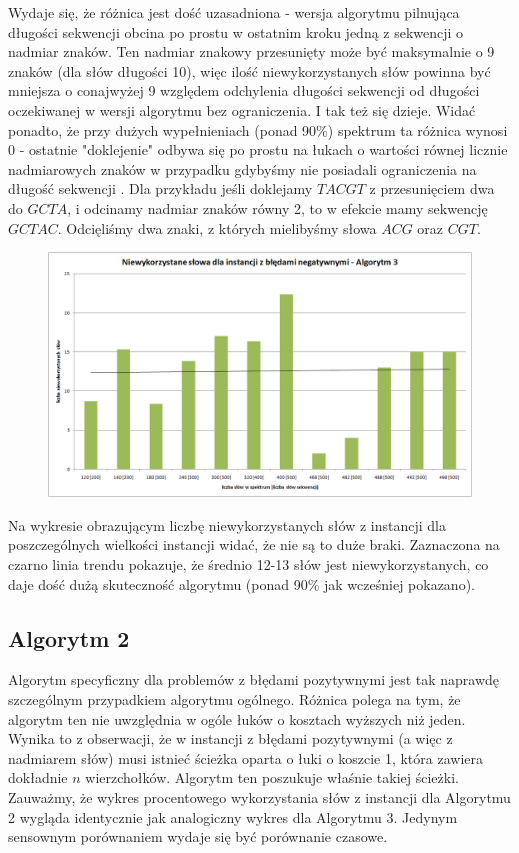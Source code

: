 \documentclass[a4paper,10pt]{article}
\begin{document}
Wydaje się, że różnica jest dość uzasadniona - wersja algorytmu pilnująca długości sekwencji obcina po prostu w ostatnim kroku jedną z sekwencji o nadmiar znaków. Ten nadmiar znakowy przesunięty może być maksymalnie o 9 znaków (dla słów długości 10), więc ilość niewykorzystanych słów powinna być mniejsza o conajwyżej 9 względem odchylenia długości sekwencji od długości oczekiwanej w wersji algorytmu bez ograniczenia. I tak też się dzieje. Widać ponadto, że przy dużych wypełnieniach (ponad 90\%) spektrum ta różnica wynosi 0 - ostatnie "doklejenie" odbywa się po prostu na łukach o wartości równej licznie nadmiarowych znaków w przypadku gdybyśmy nie posiadali ograniczenia na długość sekwencji . Dla przykładu jeśli doklejamy $TACGT$ z przesunięciem dwa do $GCTA$, i odcinamy nadmiar znaków równy 2, to w efekcie mamy sekwencję $GCTAC$. Odcięliśmy dwa znaki, z których mielibyśmy słowa $ACG$ oraz $CGT$.

\begin{figure}[h]
  \footnotesize\centering
  \includegraphics[width=\textwidth,keepaspectratio]{unusedWords_general_negative.png}
\end{figure}

Na wykresie obrazującym liczbę niewykorzystanych słów z instancji dla poszczególnych wielkości instancji widać, że nie są to duże braki. Zaznaczona na czarno linia trendu pokazuje, że średnio 12-13 słów jest niewykorzystanych, co daje dość dużą skuteczność algorytmu (ponad 90\% jak wcześniej pokazano).

\subsection{Algorytm 2}

Algorytm specyficzny dla problemów z błędami pozytywnymi jest tak naprawdę szczególnym przypadkiem algorytmu ogólnego. Różnica polega na tym, że algorytm ten nie uwzględnia w ogóle łuków o kosztach wyższych niż jeden. Wynika to z obserwacji, że w instancji z błędami pozytywnymi (a więc z nadmiarem słów) musi istnieć ścieżka oparta o łuki o koszcie 1, która zawiera dokładnie $n$ wierzchołków. Algorytm ten poszukuje właśnie takiej ścieżki. Zauważmy, że wykres procentowego wykorzystania słów z instancji dla Algorytmu 2 wygląda identycznie jak analogiczny wykres dla Algorytmu 3. Jedynym sensownym porównaniem wydaje się być porównanie czasowe.
\end{document}

